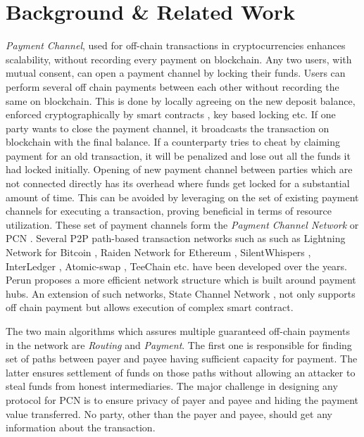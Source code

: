 \documentclass[10pt]{article}
\begin{document}
\section{Background \& Related Work}
\textit{Payment Channel}, used for off-chain transactions in cryptocurrencies enhances scalability, without recording every payment on blockchain. Any two users, with mutual consent, can open a payment channel by locking their funds. Users can perform several off chain payments between each other without recording the same on blockchain. This is done by locally agreeing on the new deposit balance, enforced cryptographically by smart contracts \cite{poon2016bitcoin}, key based locking \cite{malavoltamulti} etc. If one party wants to close the payment channel, it broadcasts the transaction on blockchain with the final balance. If a counterparty tries to cheat by claiming payment for an old transaction, it will be penalized and lose out all the funds it had locked initially. Opening of new payment channel between parties which are not connected directly has its overhead where funds get locked for a substantial amount of time. This can be avoided by leveraging on the set of existing payment channels for executing a transaction, proving beneficial in terms of resource utilization. These set of payment channels form the \textit{Payment Channel Network} or PCN \cite{poon2016bitcoin}. Several P2P path-based transaction networks such as such as Lightning Network for Bitcoin \cite{poon2016bitcoin}, Raiden Network for Ethereum \cite{raiden}, SilentWhispers \cite{silentwhispers}, InterLedger \cite{thomas2015protocol}, Atomic-swap \cite{atomic}, TeeChain \cite{lind2017teechain} etc. have been developed over the years. Perun \cite{dziembowski2017perun} proposes a more efficient network structure which is built around payment hubs. An extension of such networks, State Channel Network \cite{dziembowski2018general}, not only supports off chain payment but allows execution of complex smart contract. 

The two main algorithms which assures multiple guaranteed off-chain payments in the network are \emph{Routing} and \emph{Payment}. The first one is responsible for finding set of paths between payer and payee having sufficient capacity for payment. The latter ensures settlement of funds on those paths without allowing an attacker to steal funds from honest intermediaries. The major challenge in designing any protocol for PCN is to ensure privacy of payer and payee and hiding the payment value transferred. No party, other than the payer and payee, should get any information about the transaction. 
\end{document}
